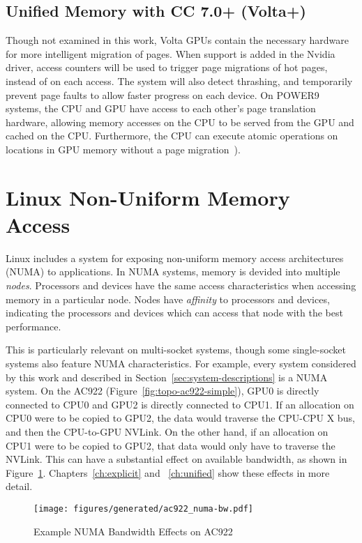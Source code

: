 \subsection {Unified Memory with CC 7.0+ (Volta+) }
Though not examined in this work, Volta GPUs contain the necessary hardware for more intelligent migration of pages.
When support is added in the Nvidia driver, access counters will be used to trigger page migrations of hot pages, instead of on each access.
The system will also detect thrashing, and temporarily prevent page faults to allow faster progress on each device.
On POWER9 systems, the CPU and GPU have access to each other's page translation hardware, allowing memory accesses on the CPU to be served from the GPU and cached on the CPU.
Furthermore, the CPU can execute atomic operations on locations in GPU memory without a page migration~\cite{sakharnykh2017unified}).

\section{Linux Non-Uniform Memory Access}
\label{sec:numa}

Linux includes a system for exposing non-uniform memory access architectures (NUMA) to applications.
In NUMA systems, memory is devided into multiple \textit{nodes}\cite{numa2012}.
Processors and devices have the same access characteristics when accessing memory in a particular node.
Nodes have \textit{affinity} to processors and devices, indicating the processors and devices which can access that node with the best performance.

This is particularly relevant on multi-socket systems, though some single-socket systems also feature NUMA characteristics.
For example, every system considered by this work and described in Section~\ref{sec:system-descriptions} is a NUMA system.
On the AC922 (Figure~\ref{fig:topo-ac922-simple}), GPU0 is directly connected to CPU0 and GPU2 is directly connected to CPU1.
If an allocation on CPU0 were to be copied to GPU2, the data would traverse the CPU-CPU X bus, and then the CPU-to-GPU NVLink.
On the other hand, if an allocation on CPU1 were to be copied to GPU2, that data would only have to traverse the NVLink.
This can have a substantial effect on available bandwidth, as shown in Figure~\ref{fig:numa-bw-example}.
Chapters~\ref{ch:explicit} and ~\ref{ch:unified} show these effects in more detail.

\begin{figure}[H]
    \centering
	\texttt{[image: figures/generated/ac922\_numa-bw.pdf]}
    \caption[Example of NUMA Bandwidth Effects on AC922]{Example NUMA Bandwidth Effects on AC922}
    \label{fig:numa-bw-example}
\end{figure}


